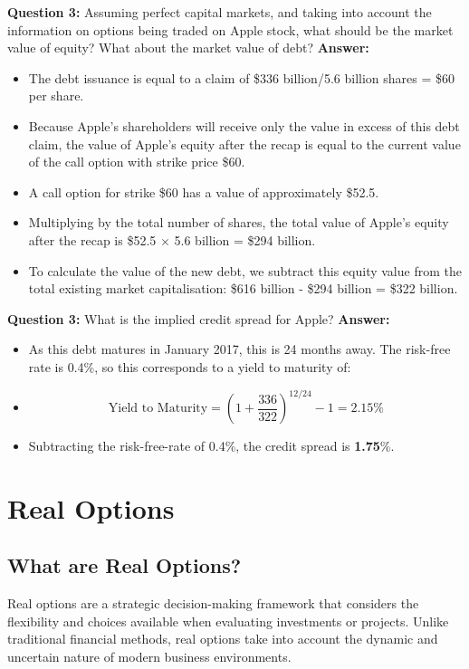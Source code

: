 \textbf{Question 3: }
Assuming perfect capital markets, and taking into account the information on options being traded on Apple stock, what should be the market value of equity? What about the market value of debt?
\textbf{Answer: }
\begin{itemize}
    \item The debt issuance is equal to a claim of \$336 billion/5.6 billion shares = \$60 per share. 
    \item Because Apple's shareholders will receive only the value in excess of this debt claim, the value of Apple's equity after the recap is equal to the current value of the call option with strike price \$60.
    \item A call option for strike \$60 has a value of approximately \$52.5.
    \item Multiplying by the total number of shares, the total value of Apple's equity after the recap is \$52.5 $\times$ 5.6 billion = \$294 billion.
    \item To calculate the value of the new debt, we subtract this equity value from the total existing market capitalisation: \$616 billion - \$294 billion = \$322 billion.
\end{itemize}



\textbf{Question 3: }
What is the implied credit spread for Apple?
\textbf{Answer: }
\begin{itemize}
    \item As this debt matures in January 2017, this is 24 months away. The risk-free rate is 0.4\%, so this corresponds to a yield to maturity of:
    \item \begin{equation}
        \text{Yield to Maturity} = \left(1 + \frac{336}{322}\right)^{12/24} - 1 = 2.15\%
    \end{equation}
    \item Subtracting the risk-free-rate of 0.4\%, the credit spread is \textbf{1.75}\%.
\end{itemize}

\section{Real Options}
\subsection*{What are Real Options?}

Real options are a strategic decision-making framework that considers the flexibility and choices available when evaluating investments or projects. Unlike traditional financial methods, real options take into account the dynamic and uncertain nature of modern business environments.

